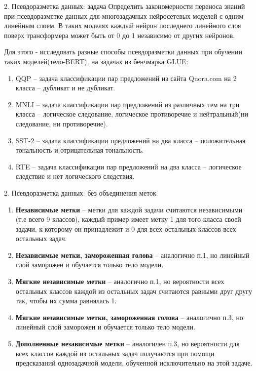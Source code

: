 \begin{frame}{2. Псевдоразметка данных: задача}
Определить закономерности переноса знаний при псевдоразметке данных для многозадачных нейросетевых моделей с одним линейным слоем. В таких моделях каждый нейрон последнего линейного слоя поверх трансформера может быть от 0 до 1 независимо от других нейронов.

    Для этого - исследовать разные способы псевдоразметки данных при обучении таких моделей(тело-BERT), на задачах из бенчмарка GLUE:
    \begin{enumerate}
    \item QQP -- задача классификации пар предложений из сайта Quora.com на 2 класса -- дубликат и не дубликат.
    \item MNLI -- задача классификации пар предложений из различных тем на три класса -- логическое следование, логическое противоречие и нейтральный(ни следование, ни противоречие).
    \item SST-2 -- задача классификации предложений на два класса -- положительная тональность и отрицательная тональность.
    \item RTE -- задача классификации пар предложений на два класса -- логическое следствие и нет логического следствия.
    \end{enumerate}
\end{frame}


\begin{frame}{2. Псевдоразметка данных: без объединения меток}
    \begin{enumerate}
\item \textbf{Независимые метки} -- метки для каждой задачи считаются независимыми (т.е всего 9 классов), каждый пример имеет метку 1 для того класса своей задачи, к которому он принадлежит и 0 для всех остальных классов всех остальных задач. 
\item \textbf{Независимые метки, замороженная голова} -- аналогично п.1, но линейный слой заморожен и обучается только тело модели.
\item \textbf{Мягкие независимые метки} -- аналогично п.1, но вероятности всех остальных классов каждой из остальных задач считаются равными друг другу так, чтобы их сумма равнялась 1. 
\item \textbf{Мягкие независимые метки, замороженная голова} -- аналогично п.3, но линейный слой заморожен и обучается только тело модели.
\item \textbf{Дополненные независимые метки} -- аналогичен п.3, но вероятности для всех классов каждой из остальных задач получаются при помощи предсказаний однозадачной модели, обученной исключительно на этой задаче.
    \end{enumerate}
\end{frame}


